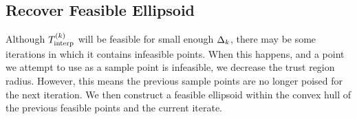 % 
% 
% 
% 
% 
% 



\subsection{Recover Feasible Ellipsoid}

Although ${T_{\text{interp}}^{(k)}}$ will be feasible for small enough $\Delta_k$, there may be some iterations in which it contains infeasible points.
When this happens, and a point we attempt to use as a sample point is infeasible, we decrease the trust region radius.
However, this means the previous sample points are no longer poised for the next iteration.
We then construct a feasible ellipsoid within the convex hull of the previous feasible points and the current iterate.

%             
% 


